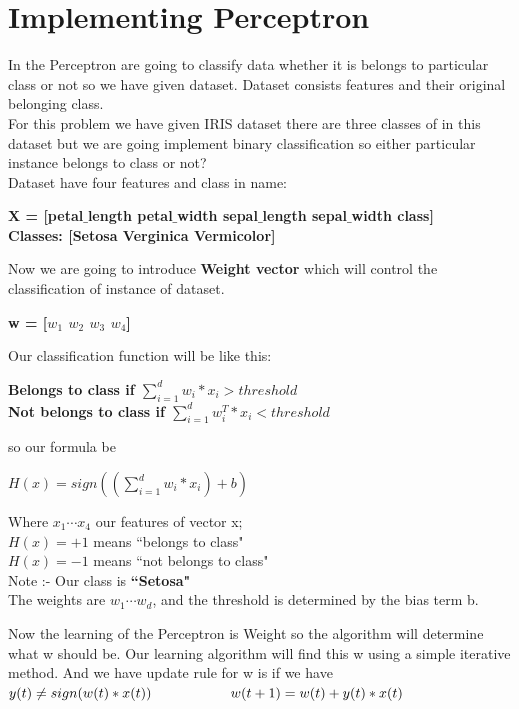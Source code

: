 \documentclass{sem6}
\author{Dilip Puri}
\begin{document}
\section{Implementing Perceptron}
In the Perceptron are going to classify data whether it is belongs to particular class or not so we have given dataset. Dataset consists features and their original belonging class.\\
For this problem we have given IRIS dataset there are three classes of in this dataset but we are going implement binary classification so either particular instance belongs to class or not?\\
Dataset have four features and class in name:
\begin{center}
\textbf{X = [petal$\_$length petal$\_$width sepal$\_$length sepal$\_$width class]\\}
\textbf{Classes: [Setosa Verginica Vermicolor]\\}
\end{center}
Now we are going to introduce \textbf{Weight vector} which will control the classification of instance of dataset.
\begin{center}
\textbf{w = [$w_1$ $w_2$ $w_3$ $w_4$]\\}
\end{center}
Our classification function will be like this:
\begin{center}
\textbf{Belongs to class if $\sum_{i=1}^d w_i*x_i > threshold$\\}
\textbf{Not belongs to class if $\sum_{i=1}^d w_i^T*x_i < threshold$\\}
\end{center}
so our formula be
\begin{center}
$H(x) = sign((\sum_{i=1}^d w_i*x_i)+b)$
\end{center}
\begin{flushright}
Where $x_1 \cdots x_4$ our features of vector x;\\
$H(x) = +1$ means ``belongs to class"\\
$H(x) = -1$ means ``not belongs to class"\\
Note :- Our class is \textbf{``Setosa"\\}
The weights are $w_1 \cdots w_d$, and the threshold is determined by the bias term b.
\end{flushright}
Now the learning of the Perceptron is Weight so the algorithm will determine what w should be. Our learning algorithm will find this w using a simple iterative method. And we have update rule for w is if we have $y(t) \neq sign(w(t)*x(t))\hspace*{2cm} w(t+1) = w(t) + y(t)*x(t)\\ $
\end{document}
